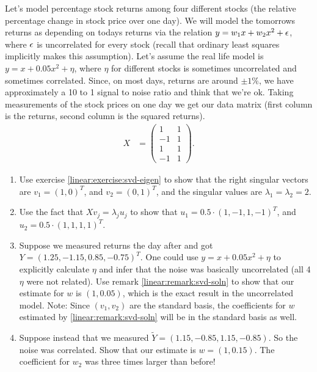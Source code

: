\begin{exercise}
  Let's model percentage stock returns among four different stocks (the relative percentage change in stock price over one day).  We will model the tomorrows returns as depending on todays returns via the relation $y = w_1x + w_2x^2 + {\epsilon}$, where ${\epsilon}$ is uncorrelated for every stock (recall that ordinary least squares implicitly makes this assumption).  Let's assume the real life model is $y = x + 0.05x^2 + \eta$, where $\eta$ for different stocks is sometimes uncorrelated and sometimes correlated. Since, on most days, returns are around $\pm1\%$, we have approximately a 10 to 1 signal to noise ratio and think that we're ok.  Taking measurements of the stock prices on one day we get our data matrix (first column is the returns, second column is the squared returns).
  \begin{align}
    X &= \left( 
    \begin{matrix}
      1 & 1\\
      -1 & 1 \\
      1 & 1 \\
      -1 & 1
    \end{matrix}
    \right).
    \label{linear:align:bad-matrix}
  \end{align}
  \begin{enumerate}
    \item Use exercise \ref{linear:exercise:svd-eigen} to show that the right singular vectors are $v_1=(1,0)^T$, and $v_2=(0,1)^T$, and the singular values are $\lambda_1=\lambda_2=2$.
    \item Use the fact that $Xv_j = \lambda_ju_j$ to show that $u_1=0.5\cdot(1, -1, 1, -1)^T$, and $u_2=0.5\cdot(1, 1, 1, 1)^T$.
    \item Suppose we measured returns the day after and got $Y = (1.25, -1.15, 0.85, -0.75)^T$.  One could use $y = x + 0.05x^2 + \eta$ to explicitly calculate $\eta$ and infer that the noise was basically uncorrelated (all 4 $\eta$ were not related).  Use remark \ref{linear:remark:svd-soln} to show that our estimate for $w$ is $(1, 0.05)$, which is the exact result in the uncorrelated model.  Note:  Since $(v_1, v_2)$ are the standard basis, the coefficients for $w$ estimated by \ref{linear:remark:svd-soln} will be in the standard basis as well.
\item Suppose instead that we measured $\tilde Y=(1.15, -0.85, 1.15, -0.85)$.  So the noise was correlated.  Show that our estimate is $w = (1, 0.15)$.  The coefficient for $w_2$ was three times larger than before!

\end{enumerate}
\end{exercise}
